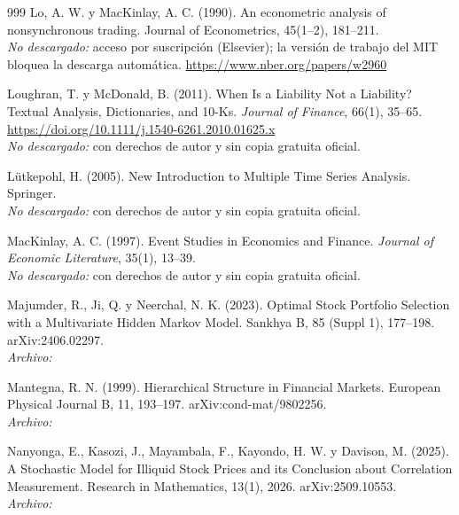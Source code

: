 \begin{thebibliography}{999}
Lo, A. W. y MacKinlay, A. C. (1990). An econometric analysis of nonsynchronous trading. Journal of Econometrics, 45(1–2), 181–211.
\\\textit{No descargado:} acceso por suscripción (Elsevier); la versión de trabajo del MIT bloquea la descarga automática. \url{https://www.nber.org/papers/w2960}

Loughran, T. y McDonald, B. (2011). When Is a Liability Not a Liability? Textual Analysis, Dictionaries, and 10-Ks. \emph{Journal of Finance}, 66(1), 35--65. \url{https://doi.org/10.1111/j.1540-6261.2010.01625.x}
\\\textit{No descargado:} con derechos de autor y sin copia gratuita oficial.

L{\"u}tkepohl, H. (2005). New Introduction to Multiple Time Series Analysis. Springer.
\\\textit{No descargado:} con derechos de autor y sin copia gratuita oficial.

MacKinlay, A. C. (1997). Event Studies in Economics and Finance. \emph{Journal of Economic Literature}, 35(1), 13--39.
\\\textit{No descargado:} con derechos de autor y sin copia gratuita oficial.

Majumder, R., Ji, Q. y Neerchal, N. K. (2023). Optimal Stock Portfolio Selection with a Multivariate Hidden Markov Model. Sankhya B, 85 (Suppl 1), 177–198. arXiv:2406.02297.
\\\textit{Archivo:} 

Mantegna, R. N. (1999). Hierarchical Structure in Financial Markets. European Physical Journal B, 11, 193–197. arXiv:cond-mat/9802256.
\\\textit{Archivo:} 

Nanyonga, E., Kasozi, J., Mayambala, F., Kayondo, H. W. y Davison, M. (2025). A Stochastic Model for Illiquid Stock Prices and its Conclusion about Correlation Measurement. Research in Mathematics, 13(1), 2026. arXiv:2509.10553.
\\\textit{Archivo:} 


\end{thebibliography}
